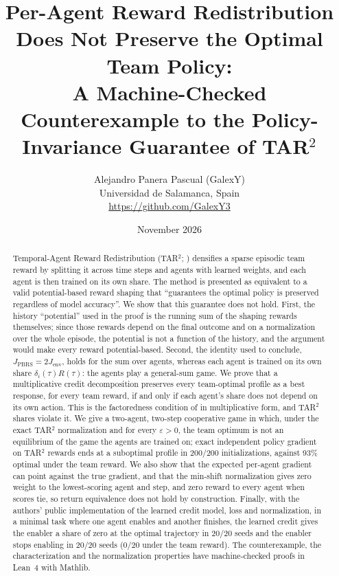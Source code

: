 \documentclass[11pt]{article}
\title{Per-Agent Reward Redistribution Does Not Preserve the Optimal Team Policy:\\
A Machine-Checked Counterexample to the Policy-Invariance Guarantee of TAR$^2$}
\author{Alejandro Panera Pascual (GalexY)\\ \small Universidad de Salamanca, Spain\\ \small \url{https://github.com/GalexY3}}
\date{November 2026}
\theoremstyle{remark}
\begin{document}
\maketitle

\begin{abstract}
Temporal-Agent Reward Redistribution (TAR$^2$; \citealp{kapoor2025tar2}) densifies a sparse episodic team reward by splitting it across time steps and agents with learned weights, and each agent is then trained on its own share. The method is presented as equivalent to a valid potential-based reward shaping that ``guarantees the optimal policy is preserved regardless of model accuracy''. We show that this guarantee does not hold. First, the history ``potential'' used in the proof is the running sum of the shaping rewards themselves; since those rewards depend on the final outcome and on a normalization over the whole episode, the potential is not a function of the history, and the argument would make every reward potential-based. Second, the identity used to conclude, $J_{\mathrm{PBRS}}=2J_{\mathrm{env}}$, holds for the sum over agents, whereas each agent is trained on its own share $\delta_i(\tau)R(\tau)$: the agents play a general-sum game. We prove that a multiplicative credit decomposition preserves every team-optimal profile as a best response, for every team reward, if and only if each agent's share does not depend on its own action. This is the factoredness condition of \citet{wolpert1999coin} in multiplicative form, and TAR$^2$ shares violate it. We give a two-agent, two-step cooperative game in which, under the exact TAR$^2$ normalization and for every $\varepsilon>0$, the team optimum is not an equilibrium of the game the agents are trained on; exact independent policy gradient on TAR$^2$ rewards ends at a suboptimal profile in 200/200 initializations, against 93\% optimal under the team reward. We also show that the expected per-agent gradient can point against the true gradient, and that the min-shift normalization gives zero weight to the lowest-scoring agent and step, and zero reward to every agent when scores tie, so return equivalence does not hold by construction. Finally, with the authors' public implementation of the learned credit model, loss and normalization, in a minimal task where one agent enables and another finishes, the learned credit gives the enabler a share of zero at the optimal trajectory in 20/20 seeds and the enabler stops enabling in 20/20 seeds (0/20 under the team reward). The counterexample, the characterization and the normalization properties have machine-checked proofs in Lean~4 with Mathlib.
\end{abstract}
\end{document}
